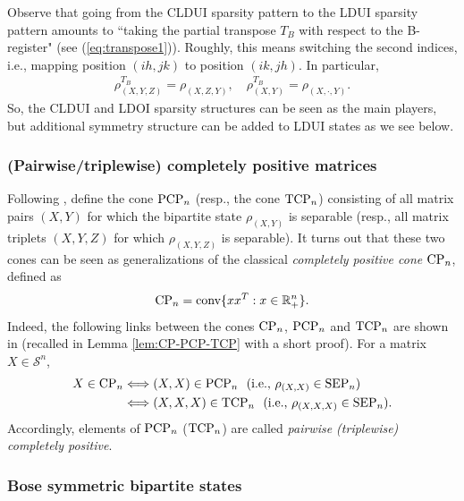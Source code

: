 \documentclass[11pt]{article}
\newcommand{\R}{\ensuremath{\mathbb{R}}}   %
\newcommand{\MS}{{\mathcal S}}
\newcommand{\PCP}{\text{\rm PCP}}
\newcommand{\TCP}{\text{\rm TCP}}
\newcommand{\SEP}{\text{\rm SEP}}
\newcommand{\CP}{\text{\rm CP}}
\newcommand{\conv}{\text{\rm conv}}
\newcommand{\sfT}{T}
\theoremstyle{plain}
\newcommand{\ML}{\textcolor{blue}}
\begin{document}
Observe that going from  the CLDUI sparsity pattern to the LDUI sparsity pattern amounts to ``taking the partial transpose $T_B$ with respect to the B-register" (see (\ref{eq:transpose1})). Roughly, this means switching the second indices,  i.e., mapping position $(ih,jk)$ to position $(ik,jh)$. In particular, 
\begin{align}\label{eq:rhoXYZ-block-PT}
\rho_{(X,Y,Z)}^{T_B}=\rho_{(X,Z,Y)},\quad \rho_{(X,Y)}^{T_B}= \rho_{(X,\cdot,Y)}.
\end{align}
So, the CLDUI and LDOI sparsity structures can be seen as the main players, but additional symmetry structure can be added to LDUI states as we see below.
 
\subsubsection*{(Pairwise/triplewise)   completely positive matrices}

Following \cite{JML-PCP,SN-CLDUI}, define  the cone $\PCP_n$ (resp., the cone $\TCP_n$) consisting of all matrix pairs $(X,Y)$ for which the bipartite state $\rho_{(X,Y)}$ is separable (resp., all matrix triplets $(X,Y,Z)$ for which $\rho_{(X,Y,Z)}$ is separable).  
 It turns out that these two cones can be seen as  generalizations of the classical {\em completely positive cone} $\CP_n$, defined as 
  \begin{align}\label{eq:CP}
 \CP_n=\conv\{xx^\sfT: x\in\R^n_+\}.
 \end{align}
Indeed, the following links between the cones $\CP_n$, $\PCP_n$ and $\TCP_n$   are shown in \cite{JML-PCP,SN-CLDUI} (recalled in Lemma \ref{lem:CP-PCP-TCP} with a short proof).  For a matrix $X\in \MS^n$, 
 \begin{align}\label{eq:CP-PCP-TCP}
\begin{split}
X\in \CP_n & \Longleftrightarrow  (X,X)\in \PCP_n \ \ (\text{\rm i.e., } \rho_{(X,X)}\in\SEP_n)  \\& \Longleftrightarrow (X,X,X)\in \TCP_n 
\ \ (\text{\rm i.e., } \rho_{(X,X,X)}\in\SEP_n).  
\end{split}
\end{align}
Accordingly, elements of $\PCP_n$ ($\TCP_n$) are called {\em pairwise (triplewise) completely positive}. 

\subsubsection*{Bose symmetric bipartite states}
\end{document}

